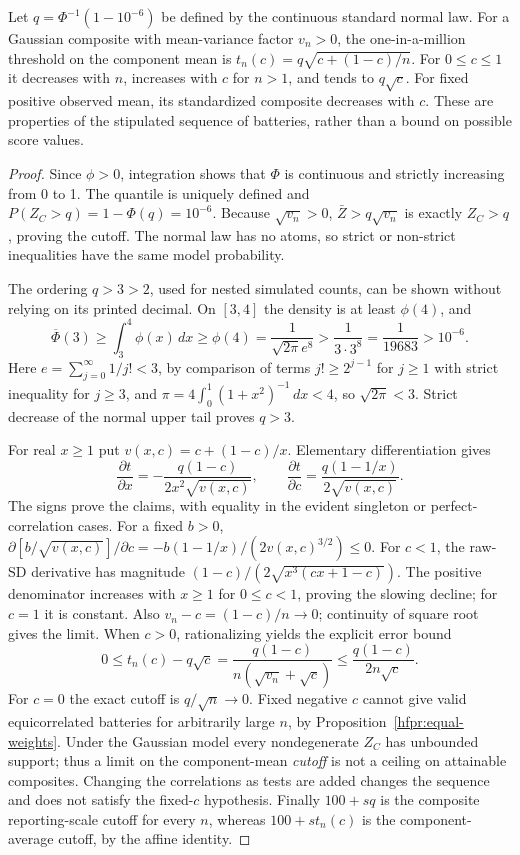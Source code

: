 \begin{proposition}
\label{hfpr:thresholds}
Let \(q=\Phi^{-1}(1-10^{-6})\) be defined by the continuous standard
normal law. For a Gaussian composite with mean-variance factor \(v_n>0\),
the one-in-a-million threshold on the component mean is
\(t_n(c)=q\sqrt{c+(1-c)/n}\). For \(0\leq c\leq1\) it decreases
with \(n\), increases with \(c\) for \(n>1\), and tends to
\(q\sqrt c\). For fixed positive observed mean, its standardized
composite decreases with \(c\). These are properties of the stipulated
sequence of batteries, rather than a bound on possible score values.
\end{proposition}
\begin{proof}
Since \(\phi>0\), integration shows that \(\Phi\) is continuous and
strictly increasing from 0 to 1. The quantile is uniquely defined and
\(P(Z_C>q)=1-\Phi(q)=10^{-6}\). Because \(\sqrt{v_n}>0\),
\(\bar Z>q\sqrt{v_n}\) is exactly \(Z_C>q\), proving the cutoff.
The normal law has no atoms, so strict or non-strict inequalities have
the same model probability.

The ordering \(q>3>2\), used for nested simulated counts, can be shown
without relying on its printed decimal. On \([3,4]\) the density is
at least \(\phi(4)\), and
\[
 \overline\Phi(3)\geq\int_3^4\phi(x)\,dx\geq\phi(4)
 =\frac{1}{\sqrt{2\pi}e^8}>
 \frac{1}{3\cdot3^8}=\frac1{19683}>10^{-6}.
\]
Here \(e=\sum_{j=0}^{\infty}1/j!<3\), by comparison of terms
\(j!\geq2^{j-1}\) for \(j\geq1\) with strict inequality for
\(j\geq3\), and \(\pi=4\int_0^1(1+x^2)^{-1}\,dx<4\), so
\(\sqrt{2\pi}<3\). Strict decrease of the normal upper tail proves
\(q>3\).

For real \(x\geq1\) put \(v(x,c)=c+(1-c)/x\). Elementary
differentiation gives
\[
 \frac{\partial t}{\partial x}
 =-\frac{q(1-c)}{2x^2\sqrt{v(x,c)}},\qquad
 \frac{\partial t}{\partial c}
 =\frac{q(1-1/x)}{2\sqrt{v(x,c)}}.
\]
The signs prove the claims, with equality in the evident singleton or
perfect-correlation cases. For a fixed \(b>0\),
\(\partial[b/\sqrt{v(x,c)}]/\partial c
=-b(1-1/x)/(2v(x,c)^{3/2})\leq0\).
For \(c<1\), the raw-SD derivative has magnitude
\((1-c)/(2\sqrt{x^3(cx+1-c)})\). The positive denominator increases
with \(x\geq1\) for \(0\leq c<1\), proving the slowing decline;
for \(c=1\) it is constant.
Also \(v_n-c=(1-c)/n\to0\); continuity of square root gives the limit.
When \(c>0\), rationalizing yields the explicit error bound
\[
 0\leq t_n(c)-q\sqrt c
 =\frac{q(1-c)}{n(\sqrt{v_n}+\sqrt c)}
 \leq\frac{q(1-c)}{2n\sqrt c}.
\]
For \(c=0\) the exact cutoff is \(q/\sqrt n\to0\). Fixed negative
\(c\) cannot give valid equicorrelated batteries for arbitrarily large
\(n\), by Proposition~\ref{hfpr:equal-weights}. Under the Gaussian model
every nondegenerate \(Z_C\) has unbounded support; thus a limit on the
component-mean \emph{cutoff} is not a ceiling on attainable composites.
Changing the correlations as tests are added changes the sequence and
does not satisfy the fixed-\(c\) hypothesis. Finally \(100+s q\) is
the composite reporting-scale cutoff for every \(n\), whereas
\(100+s t_n(c)\) is the component-average cutoff, by the affine identity.
\end{proof}

